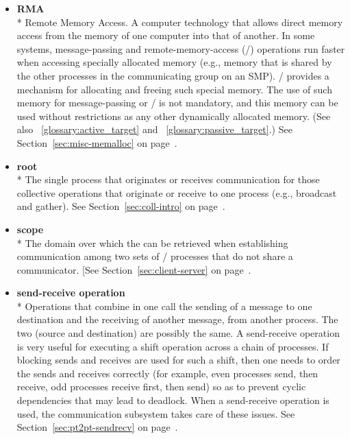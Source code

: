\begin{itemize}
\label{glossary:RMA}
\item \textbf{ RMA} \\*
Remote Memory Access. A computer technology that allows
direct memory access from the memory of one computer into that of another.
In some systems, message-passing and remote-memory-access (\RMA/) operations
run faster when accessing specially allocated memory (e.g., memory that is
shared by the other processes in the communicating group on an SMP).  \MPI/
provides a mechanism for allocating and freeing such special memory.  The use
of such memory for message-passing or \RMA/ is not mandatory, and this memory
can be used without restrictions as any other dynamically allocated memory.
(See also ~\ref{glossary:active_target} and ~\ref{glossary:passive_target}.)
See Section~\ref{sec:misc-memalloc} on page~\pageref{sec:misc-memalloc}.

\label{glossary:root}
\item \textbf{ root} \\*
The single process that originates or receives communication for those collective
operations that originate or receive to one process (e.g., broadcast and gather). 
See Section~\ref{sec:coll-intro} on page~\pageref{sec:coll-intro}.

\label{glossary:scope}
\item \textbf{ scope} \\*
The domain over which the  
can be retrieved when establishing communication among
two sets of \MPI/ processes that do not share a communicator.
[See Section~\ref{sec:client-server} on page~\pageref{sec:client-server}.

\label{glossary:send-receive_operation}
\item \textbf{ send-receive operation} \\*
Operations that combine in one call the sending of a
message to one destination and the receiving of another message, from
another process.  The two (source and destination) are possibly the same.
A send-receive operation is
very useful for executing a shift operation across a chain of
processes.  If blocking sends and receives are used for such a shift,
then one needs to order the sends and receives correctly (for
example, even processes
send, then receive, odd processes receive first, then send) so as to prevent
cyclic dependencies that may lead to deadlock.  When a send-receive
operation is used, the communication subsystem takes care of
these issues.
See Section~\ref{sec:pt2pt-sendrecv} on page~\pageref{sec:pt2pt-sendrecv}.


\end{itemize}
